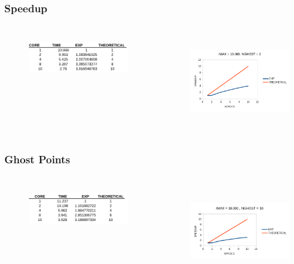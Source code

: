 \documentclass{beamer}
\begin{document}
    \begin{frame}
        \frametitle{Speedup}
        
        \begin{columns}
            \begin{figure}
                \includegraphics[height = 20mm,width = 50mm]{table_1g_speed.png}             
            \end{figure}       
    
            \begin{figure}
                \includegraphics[height = 40mm,width = 50mm]{plot_1g_speed.png}            
            \end{figure}       
            \end{columns}
    \end{frame}

    \begin{frame}
        \frametitle{Ghost Points}
        
        \begin{columns}
            \begin{figure}
                \includegraphics[height = 20mm,width = 50mm]{table_10g_speed.png}             
            \end{figure}       
    
            \begin{figure}
                \includegraphics[height = 40mm,width = 50mm]{plot_10g_speed.png}            
            \end{figure}       
            \end{columns}

    \end{frame}
\end{document}
